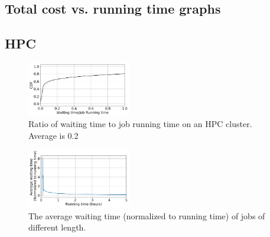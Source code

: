 \subsection{Total cost vs. running time graphs}

\subsection{HPC}

\begin{figure}
  \includegraphics[width=0.4\textwidth]{../data/waiting_all.pdf}
  \caption{Ratio of waiting time to job running time on an HPC cluster. Average is 0.2}
  \label{fig:hpc-wait-cdf}
\end{figure}

\begin{figure}
  \includegraphics[width=0.4\textwidth]{../data/waiting_cumul.pdf}
  \caption{The average waiting time (normalized to running time) of jobs of different length.}
  \label{fig:hpc-wait-cdf}
\end{figure}


